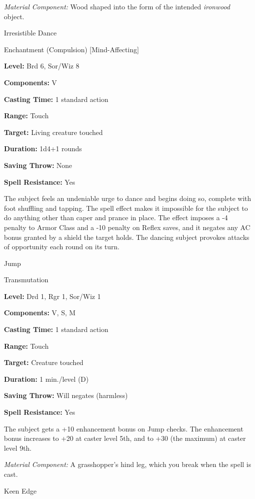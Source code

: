 \documentclass{article}
\begin{document}
\textit{Material Component: }Wood shaped into the form of the intended \textit{ironwood 
}object.

\vspace{12pt}
Irresistible Dance

Enchantment (Compulsion) [Mind-Affecting]

\textbf{Level:} Brd 6, Sor/Wiz 8

\textbf{Components:} V

\textbf{Casting Time:} 1 standard action

\textbf{Range:} Touch

\textbf{Target:} Living creature touched

\textbf{Duration:} 1d4+1 rounds

\textbf{Saving Throw:} None

\textbf{Spell Resistance:} Yes

The subject feels an undeniable urge to dance and begins doing so, complete with 
foot shuffling and tapping. The spell effect makes it impossible for the subject 
to do anything other than caper and prance in place. The effect imposes a -4 penalty 
to Armor Class and a -10 penalty on Reflex saves, and it negates any AC bonus granted 
by a shield the target holds. The dancing subject provokes attacks of opportunity 
each round on its turn.

\vspace{12pt}
Jump

Transmutation

\textbf{Level:} Drd 1, Rgr 1, Sor/Wiz 1

\textbf{Components:} V, S, M

\textbf{Casting Time:} 1 standard action

\textbf{Range:} Touch

\textbf{Target:} Creature touched

\textbf{Duration:} 1 min./level (D)

\textbf{Saving Throw: }Will negates (harmless)

\textbf{Spell Resistance:} Yes

The subject gets a +10 enhancement bonus on Jump checks. The enhancement bonus 
increases to +20 at caster level 5th, and to +30 (the maximum) at caster level 
9th.

\textit{Material Component: }A grasshopper's hind leg, which you break when the 
spell is cast.

\vspace{12pt}
Keen Edge
\end{document}
